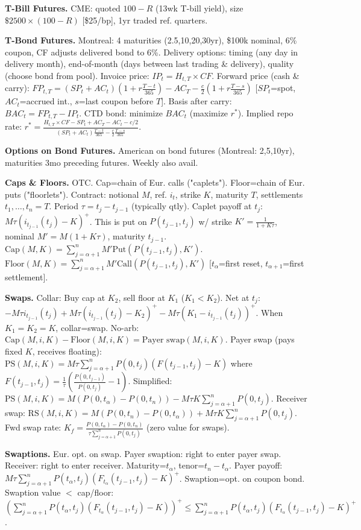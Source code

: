 \documentclass[landscape]{article}
\begin{document}
\begin{multicols}{4}
\textbf{T-Bill Futures.} CME: quoted $100-R$ (13wk T-bill yield), size $\$2500\times(100-R)$ [\$25/bp], 1yr traded ref. quarters.

\textbf{T-Bond Futures.} Montreal: 4 maturities (2.5,10,20,30yr), \$100k nominal, 6\% coupon, CF adjusts delivered bond to 6\%. Delivery options: timing (any day in delivery month), end-of-month (days between last trading \& delivery), quality (choose bond from pool). Invoice price: $IP_t=H_{t,T}\times CF$. Forward price (cash \& carry): $FP_{t,T}=(SP_t+AC_t)(1+r\frac{T-t}{365})-AC_T-\frac{c}{2}(1+r\frac{T-s}{365})$ [$SP_t$=spot, $AC_t$=accrued int., $s$=last coupon before $T$]. Basis after carry: $BAC_t=FP_{t,T}-IP_t$. CTD bond: minimize $BAC_t$ (maximize $r^*$). Implied repo rate: $r^*=\frac{H_{t,T}\times CF-SP_t+AC_T-AC_t-c/2}{(SP_t+AC_t)\frac{T-t}{365}-\frac{c}{2}\frac{T-s}{365}}$.

\textbf{Options on Bond Futures.} American on bond futures (Montreal: 2,5,10yr), maturities 3mo preceding futures. Weekly also avail.

\textbf{Caps \& Floors.} OTC. Cap=chain of Eur. calls ("caplets"). Floor=chain of Eur. puts ("floorlets"). Contract: notional $M$, ref. $i_t$, strike $K$, maturity $T$, settlements $t_1,\ldots,t_n=T$. Period $\tau=t_j-t_{j-1}$ (typically qtly). Caplet payoff at $t_j$: $M\tau(i_{t_{j-1}}(t_j)-K)^+$. This is put on $P(t_{j-1},t_j)$ w/ strike $K'=\frac{1}{1+K\tau}$, nominal $M'=M(1+K\tau)$, maturity $t_{j-1}$. $\text{Cap}(M,K)=\sum_{j=\alpha+1}^n M'\text{Put}(P(t_{j-1},t_j),K')$. $\text{Floor}(M,K)=\sum_{j=\alpha+1}^n M'\text{Call}(P(t_{j-1},t_j),K')$ [$t_\alpha$=first reset, $t_{\alpha+1}$=first settlement].

\textbf{Swaps.} Collar: Buy cap at $K_2$, sell floor at $K_1$ ($K_1<K_2$). Net at $t_j$: $-M\tau i_{t_{j-1}}(t_j)+M\tau(i_{t_{j-1}}(t_j)-K_2)^+-M\tau(K_1-i_{t_{j-1}}(t_j))^+$. When $K_1=K_2=K$, collar=swap. No-arb: $\text{Cap}(M,i,K)-\text{Floor}(M,i,K)=\text{Payer swap}(M,i,K)$. Payer swap (pays fixed $K$, receives floating): $\text{PS}(M,i,K)=M\tau\sum_{j=\alpha+1}^n P(0,t_j)(F(t_{j-1},t_j)-K)$ where $F(t_{j-1},t_j)=\frac{1}{\tau}(\frac{P(0,t_{j-1})}{P(0,t_j)}-1)$. Simplified: $\text{PS}(M,i,K)=M(P(0,t_\alpha)-P(0,t_n))-M\tau K\sum_{j=\alpha+1}^n P(0,t_j)$. Receiver swap: $\text{RS}(M,i,K)=M(P(0,t_n)-P(0,t_\alpha))+M\tau K\sum_{j=\alpha+1}^n P(0,t_j)$. Fwd swap rate: $K_f=\frac{P(0,t_\alpha)-P(0,t_n)}{\tau\sum_{j=\alpha+1}^n P(0,t_j)}$ (zero value for swaps).

\textbf{Swaptions.} Eur. opt. on swap. Payer swaption: right to enter payer swap. Receiver: right to enter receiver. Maturity=$t_\alpha$, tenor=$t_n-t_\alpha$. Payer payoff: $M\tau\sum_{j=\alpha+1}^n P(t_\alpha,t_j)(F_{t_\alpha}(t_{j-1},t_j)-K)^+$. Swaption=opt. on coupon bond. Swaption value $<$ cap/floor: $(\sum_{j=\alpha+1}^n P(t_\alpha,t_j)(F_{t_\alpha}(t_{j-1},t_j)-K))^+\leq\sum_{j=\alpha+1}^n P(t_\alpha,t_j)(F_{t_\alpha}(t_{j-1},t_j)-K)^+$.


\end{multicols}
\end{document}
